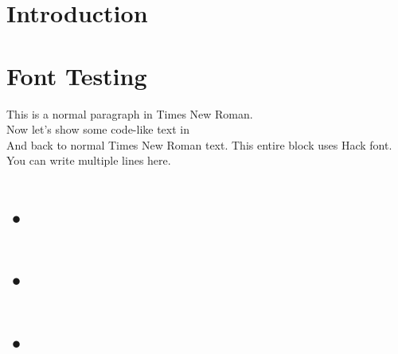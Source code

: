 \documentclass[12pt]{article}
\begin{document}
\section*{Introduction}

\section{Font Testing}
This is a normal paragraph in Times New Roman. \\
Now let's show some code-like text in  \\
And back to normal Times New Roman text.
{\hackfont
This entire block uses Hack font. \\
You can write multiple lines here.
}

\section{•}

\section{•}

\section{•}
\end{document}
